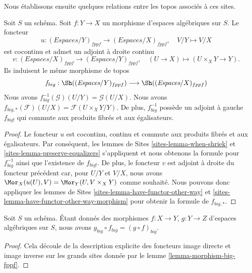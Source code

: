 \noindent
Nous établissons ensuite quelques relations entre les topos
associés à ces sites.

\begin{lemma}
\label{lemma-morphism-big-fppf}
Soit $S$ un schéma.
Soit $f : Y \to X$ un morphisme d'espaces algébriques sur $S$.
Le foncteur
$$
u : (\textit{Espaces}/Y)_{fppf} \longrightarrow (\textit{Espaces}/X)_{fppf},
\quad
V/Y \longmapsto V/X
$$
est cocontinu et admet un adjoint à droite continu
$$
v : (\textit{Espaces}/X)_{fppf} \longrightarrow (\textit{Espaces}/Y)_{fppf},
\quad
(U \to X) \longmapsto (U \times_X Y \to Y).
$$
Ils induisent le même morphisme de topos
$$
f_{big} :
\Sh((\textit{Espaces}/Y)_{fppf})
\longrightarrow
\Sh((\textit{Espaces}/X)_{fppf})
$$
Nous avons $f_{big}^{-1}(\mathcal{G})(U/Y) = \mathcal{G}(U/X)$.
Nous avons $f_{big, *}(\mathcal{F})(U/X) = \mathcal{F}(U \times_X Y/Y)$.
De plus, $f_{big}^{-1}$ possède un adjoint à gauche $f_{big!}$ qui commute aux
produits fibrés et aux égalisateurs.
\end{lemma}

\begin{proof}
Le foncteur $u$ est cocontinu, continu et commute aux produits fibrés
et aux égalisateurs. Par conséquent,
les lemmes de Sites \ref{sites-lemma-when-shriek} et
\ref{sites-lemma-preserve-equalizers}
s'appliquent et nous obtenons la formule
pour $f_{big}^{-1}$ ainsi que l'existence de $f_{big!}$. De plus,
le foncteur $v$ est adjoint à droite du foncteur précédent car, pour $U/Y$ et $V/X$,
nous avons $\Mor_X(u(U), V) = \Mor_Y(U, V \times_X Y)$
comme souhaité. Nous pouvons donc appliquer
les lemmes de Sites \ref{sites-lemma-have-functor-other-way} et
\ref{sites-lemma-have-functor-other-way-morphism} pour obtenir la
formule de $f_{big, *}$.
\end{proof}

\begin{lemma}
\label{lemma-composition-fppf}
Soit $S$ un schéma. Étant donnés des morphismes $f : X \to Y$, $g : Y \to Z$
d'espaces algébriques sur $S$, nous avons
$g_{big} \circ f_{big} = (g \circ f)_{big}$.
\end{lemma}

\begin{proof}
Cela découle de la description explicite des foncteurs image directe
et image inverse sur les grands sites donnée par le
lemme \ref{lemma-morphism-big-fppf}.
\end{proof}








